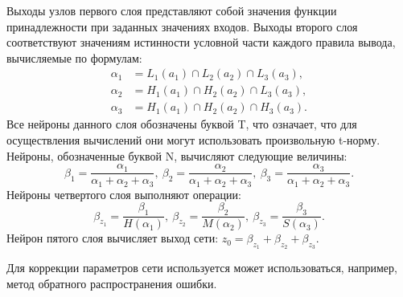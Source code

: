 Выходы узлов первого слоя представляют собой значения функции
принадлежности при заданных значениях входов.
Выходы второго слоя соответствуют значениям истинности условной части
каждого правила вывода, вычисляемые по формулам:
\[
  \begin{aligned}
    \alpha_1 &= L_1(a_1) \cap L_2(a_2) \cap L_3(a_3), \\
    \alpha_2 &= H_1(a_1) \cap H_2(a_2) \cap L_3(a_3), \\
    \alpha_3 &= H_1(a_1) \cap H_2(a_2) \cap H_3(a_3).
  \end{aligned}
\]
Все нейроны данного слоя обозначены буквой T, что означает,
что для осуществления вычислений они могут использовать
произвольную t-норму.
Нейроны, обозначенные буквой N, вычисляют следующие величины:
\[
  \beta_1 = \dfrac{\alpha_1}{\alpha_1 + \alpha_2 + \alpha_3}, \:
  \beta_2 = \dfrac{\alpha_2}{\alpha_1 + \alpha_2 + \alpha_3}, \:
  \beta_3 = \dfrac{\alpha_3}{\alpha_1 + \alpha_2 + \alpha_3}.
\]
Нейроны четвертого слоя выполняют операции:
\[
  \beta_{z_1} = \dfrac{\beta_1}{H(\alpha_1)}, \:
  \beta_{z_2} = \dfrac{\beta_2}{M(\alpha_2)}, \:
  \beta_{z_3} = \dfrac{\beta_3}{S(\alpha_3)}.
\]
Нейрон пятого слоя вычисляет выход сети:
\( z_0 = \beta_{z_1} + \beta_{z_2} + \beta_{z_3}. \)

Для коррекции параметров сети используется может использоваться,
например, метод обратного распространения ошибки.
